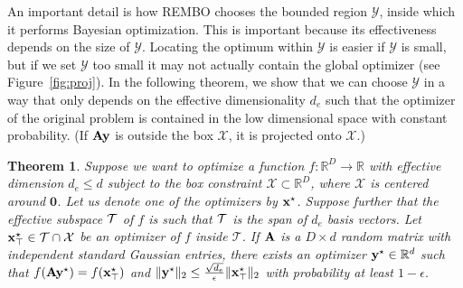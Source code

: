 \documentclass{article}
\newtheorem{theorem}[mydefinition]{Theorem}
\begin{document}
An important detail is how REMBO chooses the bounded region $\mathcal{Y}$, inside which it performs Bayesian optimization. This is important because its effectiveness depends on the size of $\mathcal{Y}$. Locating the optimum within $\mathcal{Y}$ is easier if $\mathcal{Y}$ is small, but if we set $\mathcal{Y}$ too small it may not actually contain the global optimizer (see Figure~\ref{fig:proj}).
In the following theorem, we show that we can choose $\mathcal{Y}$ in a way that only depends on the effective dimensionality $d_e$ such that the optimizer of the original problem is contained in the low dimensional space with constant probability.
(If $\mathbf{A}\mathbf{y}$ is outside the box $\mathcal{X}$, it is projected onto $\mathcal{X}$.)
\begin{theorem}
\label{prop:2}
Suppose we want to optimize a function $f: \mathbb{R}^{D} \rightarrow \mathbb{R}$ with effective dimension $d_e \leq d$ subject to the box constraint $\mathcal{X} \subset \mathbb{R}^D$, where $\mathcal{X}$ is centered around $\mathbf{0}$. Let us denote one of the optimizers by $\mathbf{x}^{\star}$.
Suppose further that the effective subspace $\cal T$ of $f$ is such that $\cal T$ is the span of $d_e$ basis vectors. 
Let $\mathbf{x}^{\star}_\top \in \cal{T} \cap \mathcal{X}$ be an optimizer of $f$ inside $\mathcal{T}$. 
If $\mathbf{A}$ is a $D\times d$ random matrix with independent standard Gaussian entries,
there exists an optimizer $\mathbf{y}^\star \in \mathbb{R}^{d}$ such that $f(\mathbf{A}\mathbf{y}^\star) = f(\mathbf{x}^\star_\top)$ and $\|\mathbf{y}^\star\|_2 \leq \frac{\sqrt{d_e}}{\epsilon}\|\mathbf{x}^{\star}_\top\|_2$ with probability at least $1-\epsilon$.
\end{theorem}
\end{document}
